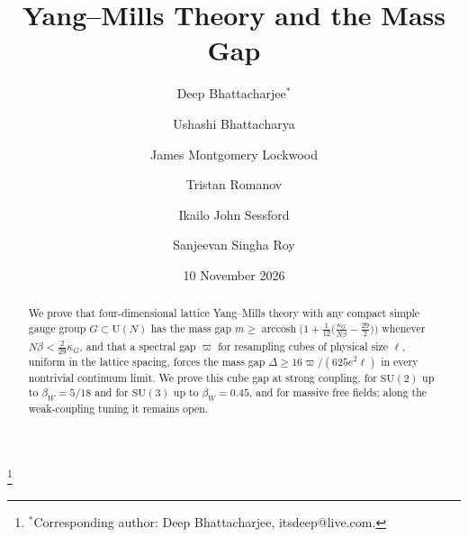 \documentclass[11pt]{amsart}
\theoremstyle{definition}
\theoremstyle{remark}
\numberwithin{equation}{section}
\newcommand{\SU}{\mathrm{SU}}
\newcommand{\U}{\mathrm{U}}
\begin{document}

\title{Yang--Mills Theory and the Mass Gap}

\author[D. Bhattacharjee]{Deep Bhattacharjee$^{*}$}
\address{Formerly, Electro-Gravitational Space Propulsion Laboratory
(EGSPL), Bhubaneswar, Odisha 751030, India; formerly, University of Calcutta (Heramba Chandra College), 23/49 Gariahat
Road, Golpark, Kolkata 700029, West Bengal, India}
\thanks{$^{*}$Corresponding author: Deep Bhattacharjee, itsdeep@live.com.}

\author[U. Bhattacharya]{Ushashi Bhattacharya}
\address{Formerly, National Taiwan University, Taipei 106319, Taiwan}

\author[J. M. Lockwood]{James Montgomery Lockwood}
\address{Independent Researcher, San Antonio, USA}

\author[T. Romanov]{Tristan Romanov}
\address{Independent Researcher, San Francisco, CA, USA}

\author[I. J. Sessford]{Ikailo John Sessford}
\address{Ikailo Inc., Whitby, Ontario, Canada}

\author[S. Singha Roy]{Sanjeevan Singha Roy}
\address{Department of Physics, Birla Institute of Technology, Mesra, Ranchi,
Jharkhand 835215, India}

\date{10 November 2026}


\begin{abstract}
We prove that four-dimensional lattice Yang--Mills theory with any compact
simple gauge group $G\subset\U(N)$ has the mass gap
$m\ge\operatorname{arccosh}\bigl(1+\frac1{12}\bigl(\frac{\kappa_G}{N\beta}
-\frac{29}2\bigr)\bigr)$ whenever $N\beta<\frac2{29}\kappa_G$, and that a
spectral gap $\varpi$ for resampling cubes of physical size $\ell$, uniform in
the lattice spacing, forces the mass gap $\Delta\ge16\varpi/(625e^2\ell)$ in
every nontrivial continuum limit. We prove this cube gap at strong coupling,
for $\SU(2)$ up to $\beta_W=5/18$ and for $\SU(3)$ up to $\beta_W=0.45$, and for
massive free fields; along the weak-coupling tuning it remains open.
\end{abstract}
\end{document}
